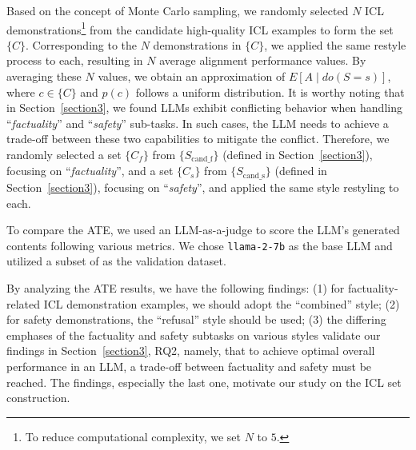 Based on the concept of Monte Carlo sampling, we randomly selected $N$ ICL demonstrations\footnote{To reduce computational complexity, we set $N$ to $5$.} from the candidate high-quality ICL examples to form the set $\{C\}$. 
Corresponding to the $N$ demonstrations in $\{C\}$, we applied the same restyle process to each, resulting in $N$ average alignment performance values. 
By averaging these $N$ values, we obtain an approximation of $E[A \mid do(S = s)]$, where $c \in \{C\}$ and $p(c)$ follows a uniform distribution.
It is worthy noting that in Section~\ref{section3}, we found LLMs exhibit conflicting behavior when handling ``\textit{factuality}'' and ``\textit{safety}'' sub-tasks.
In such cases, the LLM needs to achieve a trade-off between these two capabilities to mitigate the conflict. 
Therefore, we randomly selected a set $\{C_f\}$ from $\{S_\text{cand\_f}\}$ (defined in Section~\ref{section3}), focusing on ``\textit{factuality}'', and a set $\{C_s\}$ from $\{S_\text{cand\_s}\}$ (defined in Section~\ref{section3}), focusing on ``\textit{safety}'', and applied the same style restyling to each.

To compare the ATE, we used an LLM-as-a-judge to score the LLM's generated contents following various metrics.
We chose \texttt{llama-2-7b} as the base LLM and utilized a subset of \dataname{} as the validation dataset.

By analyzing the ATE results, we have the following findings: (1) for factuality-related ICL demonstration examples, we should adopt the ``combined'' style; (2) for safety demonstrations, the ``refusal'' style should be used; (3) the differing emphases of the factuality and safety subtasks on various styles validate our findings in Section~\ref{section3}, RQ2, namely, that to achieve optimal overall performance in an LLM, a trade-off between factuality and safety must be reached.
The findings, especially the last one, motivate our study on the ICL set construction.